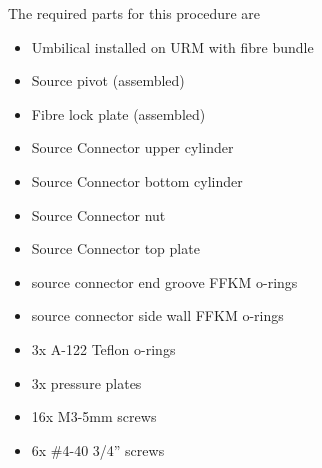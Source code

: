 \documentclass[11pt]{article}
\begin{document}
The required parts for this procedure are
\begin{itemize}
\item Umbilical installed on URM with fibre bundle
\item Source pivot (assembled)
\item Fibre lock plate (assembled)
\item Source Connector upper cylinder
\item Source Connector bottom cylinder
\item Source Connector nut
\item Source Connector top plate
\item source connector end groove FFKM o-rings
\item source connector side wall FFKM o-rings
\item 3x A-122 Teflon o-rings
\item 3x pressure plates
\item 16x M3-5mm screws
\item 6x \#4-40 3/4'' screws
\end{itemize}
\end{document}
